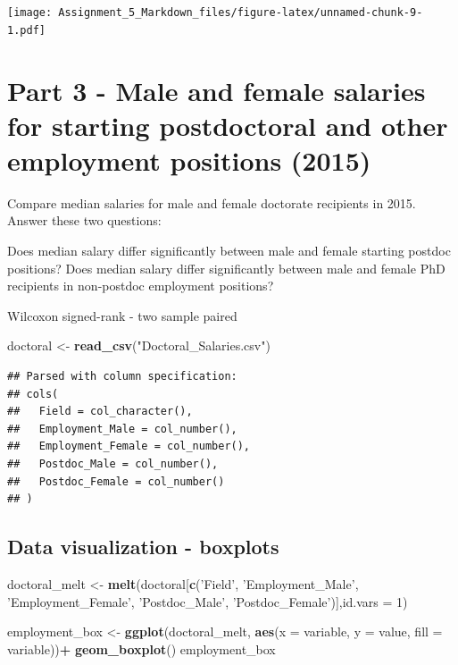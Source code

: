 \documentclass[]{article}
\newenvironment{Shaded}{\begin{snugshade}}{\end{snugshade}}
\newcommand{\KeywordTok}[1]{\textcolor[rgb]{0.13,0.29,0.53}{\textbf{#1}}}
\newcommand{\DataTypeTok}[1]{\textcolor[rgb]{0.13,0.29,0.53}{#1}}
\newcommand{\DecValTok}[1]{\textcolor[rgb]{0.00,0.00,0.81}{#1}}
\newcommand{\StringTok}[1]{\textcolor[rgb]{0.31,0.60,0.02}{#1}}
\newcommand{\OperatorTok}[1]{\textcolor[rgb]{0.81,0.36,0.00}{\textbf{#1}}}
\newcommand{\NormalTok}[1]{#1}
\begin{document}
\texttt{[image: Assignment\_5\_Markdown\_files/figure-latex/unnamed-chunk-9-1.pdf]}

\section{Part 3 - Male and female salaries for starting postdoctoral and
other employment positions
(2015)}\label{part-3---male-and-female-salaries-for-starting-postdoctoral-and-other-employment-positions-2015}

Compare median salaries for male and female doctorate recipients in
2015. Answer these two questions:

Does median salary differ significantly between male and female starting
postdoc positions? Does median salary differ significantly between male
and female PhD recipients in non-postdoc employment positions?

Wilcoxon signed-rank - two sample paired

\begin{Shaded}
\begin{Highlighting}[]
\NormalTok{doctoral <-}\StringTok{ }\KeywordTok{read_csv}\NormalTok{(}\StringTok{"Doctoral_Salaries.csv"}\NormalTok{)}
\end{Highlighting}
\end{Shaded}

\begin{verbatim}
## Parsed with column specification:
## cols(
##   Field = col_character(),
##   Employment_Male = col_number(),
##   Employment_Female = col_number(),
##   Postdoc_Male = col_number(),
##   Postdoc_Female = col_number()
## )
\end{verbatim}

\subsection{Data visualization -
boxplots}\label{data-visualization---boxplots}

\begin{Shaded}
\begin{Highlighting}[]
\NormalTok{doctoral_melt <-}\StringTok{ }\KeywordTok{melt}\NormalTok{(doctoral[}\KeywordTok{c}\NormalTok{(}\StringTok{'Field'}\NormalTok{, }\StringTok{'Employment_Male'}\NormalTok{, }\StringTok{'Employment_Female'}\NormalTok{, }\StringTok{'Postdoc_Male'}\NormalTok{, }\StringTok{'Postdoc_Female'}\NormalTok{)],}\DataTypeTok{id.vars =} \DecValTok{1}\NormalTok{)}


\NormalTok{employment_box <-}\StringTok{ }\KeywordTok{ggplot}\NormalTok{(doctoral_melt, }\KeywordTok{aes}\NormalTok{(}\DataTypeTok{x =}\NormalTok{ variable, }\DataTypeTok{y =}\NormalTok{ value, }\DataTypeTok{fill =}\NormalTok{ variable))}\OperatorTok{+}
\StringTok{  }\KeywordTok{geom_boxplot}\NormalTok{()}
\NormalTok{employment_box}
\end{Highlighting}
\end{Shaded}
\end{document}
